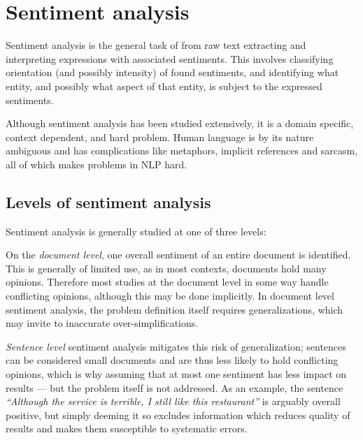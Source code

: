 \documentclass[a4paper,11pt]{kth-mag}
\begin{document}


\section{Sentiment analysis}
Sentiment analysis\cite{liu2012sentiment} is the general task of from raw text extracting and interpreting expressions with associated sentiments. This involves classifying orientation (and possibly intensity) of found sentiments, and identifying what entity, and possibly what aspect of that entity, is subject to the expressed sentiments.

Although sentiment analysis has been studied extensively, it is a domain specific, context dependent, and hard problem. Human language is by its nature ambiguous and has complications like metaphors, implicit references and sarcasm, all of which makes problems in NLP hard.

\subsection{Levels of sentiment analysis}
Sentiment analysis is generally studied at one of three levels:

On the \emph{document level}, one overall sentiment of an entire document is identified. This is generally of limited use, as in most contexts, documents hold many opinions. Therefore most studies at the document level in some way handle conflicting opinions, although this may be done implicitly\cite[Chapter~3]{liu2012sentiment}. In document level sentiment analysis, the problem definition itself requires generalizations, which may invite to inaccurate over-simplifications.

\emph{Sentence level} sentiment analysis mitigates this risk of generalization; sentences can be considered small documents and are thus less likely to hold conflicting opinions, which is why assuming that at most one sentiment has less impact on results --- but the problem itself is not addressed. As an example, the sentence \emph{``Although the service is terrible, I still like this restaurant''} is arguably overall positive, but simply deeming it so excludes information which reduces quality of results and makes them susceptible to systematic errors.
\end{document}
